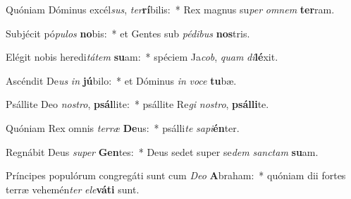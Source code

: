 \item Quóniam Dóminus excél\textit{sus}, \textit{ter}\textbf{rí}bilis:~* Rex magnus su\textit{per} \textit{om}\textit{nem} \textbf{ter}ram.
\item Subjécit pó\textit{pu}\textit{los} \textbf{no}bis:~* et Gentes sub \textit{pé}\textit{di}\textit{bus} \textbf{nos}tris.
\item Elégit nobis heredi\textit{tá}\textit{tem} \textbf{su}am:~* spéciem Ja\textit{cob}, \textit{quam} \textit{di}\textbf{lé}xit.
\item Ascéndit De\textit{us} \textit{in} \textbf{jú}bilo:~* et Dóminus \textit{in} \textit{vo}\textit{ce} \textbf{tu}bæ.
\item Psállite Deo \textit{nos}\textit{tro}, \textbf{psál}lite:~* psállite Re\textit{gi} \textit{nos}\textit{tro}, \textbf{psál}\textbf{li}te.
\item Quóniam Rex omnis \textit{ter}\textit{ræ} \textbf{De}us:~* psálli\textit{te} \textit{sa}\textit{pi}\textbf{én}ter.
\item Regnábit Deus \textit{su}\textit{per} \textbf{Gen}tes:~* Deus sedet super se\textit{dem} \textit{sanc}\textit{tam} \textbf{su}am.
\item Príncipes populórum congregáti sunt cum \textit{De}\textit{o} \textbf{A}braham:~* quóniam dii fortes terræ vehemén\textit{ter} \textit{e}\textit{le}\textbf{vá}\textbf{ti} sunt.
